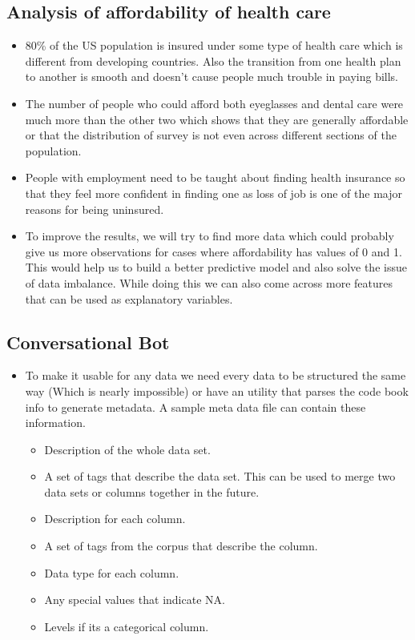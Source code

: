 \documentclass[12pt]{article}
\begin{document}
   \subsection{Analysis of affordability of health care}
   \begin{itemize}
   
    \item 80\% of the US population is insured under some type of health care which is different from developing countries. Also the transition from one health plan to another is smooth and doesn’t cause people much trouble in paying bills.
    \item The number of people who could afford both eyeglasses and dental care were much more than the other two which shows that they are generally affordable or that the distribution of survey  is not even across different sections of the population.
    \item People with employment need to be taught about finding health insurance so that they feel more confident in finding one as loss of job is one of the major reasons for being uninsured.
    \item To improve the results, we will try to find more data which could probably give us more observations for cases where affordability has values of 0 and 1. This would help us to build a better predictive model and  also solve the issue of data imbalance. While doing this we can also come across more features that can be used as explanatory variables.
    \end{itemize}
    \subsection{Conversational Bot}
\begin{itemize}
    \item To make it usable for any data we need every data to be structured the same way (Which is nearly impossible) or have an utility that parses the code book info to generate metadata.  A sample meta data file can contain these information. 
    \begin{itemize}
    

    \item Description of the whole data set.
    \item A set of tags that describe the data set. This can be used to merge two data sets or columns together in the future.
    \item Description for each column.
    \item A set of tags from the corpus that describe the column.
    \item Data type for each column.
    \item Any special values that indicate NA.
    \item Levels if its a categorical column.
    
\end{itemize}

\end{itemize}
\end{document}
